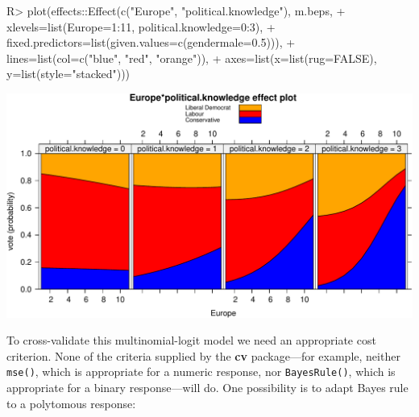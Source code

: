 \documentclass[
]{jss}
\begin{document}
\begin{CodeChunk}
\begin{CodeInput}
R> plot(effects::Effect(c("Europe", "political.knowledge"), m.beps,
+             xlevels=list(Europe=1:11, political.knowledge=0:3),
+             fixed.predictors=list(given.values=c(gendermale=0.5))),
+      lines=list(col=c("blue", "red", "orange")),
+      axes=list(x=list(rug=FALSE), y=list(style="stacked")))
\end{CodeInput}


\begin{center}\includegraphics{JSS-article_files/figure-latex/BEPS-plot-1} \end{center}

\end{CodeChunk}

To cross-validate this multinomial-logit model we need an appropriate
cost criterion. None of the criteria supplied by the \textbf{cv}
package---for example, neither \texttt{mse()}, which is appropriate for
a numeric response, nor \texttt{BayesRule()}, which is appropriate for a
binary response---will do. One possibility is to adapt Bayes rule to a
polytomous response:
\end{document}
